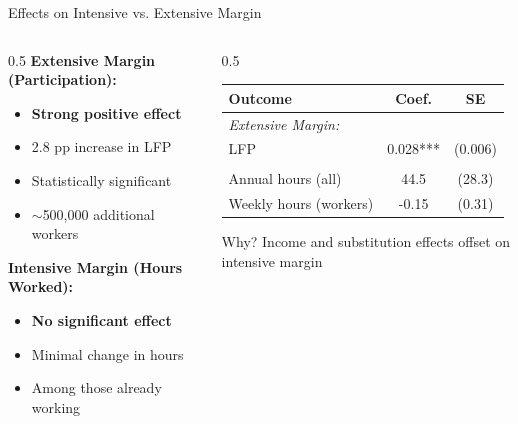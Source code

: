 \documentclass[aspectratio=169]{beamer}
\begin{document}
\begin{frame}{Effects on Intensive vs. Extensive Margin}
\begin{columns}
\begin{column}{0.5\textwidth}
\textbf{Extensive Margin (Participation):}
\begin{itemize}
    \item \textcolor{green!70!black}{\textbf{Strong positive effect}}
    \item 2.8 pp increase in LFP
    \item Statistically significant
    \item $\sim$500,000 additional workers
\end{itemize}

\vspace{0.5cm}
\textbf{Intensive Margin (Hours Worked):}
\begin{itemize}
    \item \textcolor{red!70!black}{\textbf{No significant effect}}
    \item Minimal change in hours
    \item Among those already working
\end{itemize}
\end{column}

\begin{column}{0.5\textwidth}
\begin{table}
\centering
\small
\begin{tabular}{lcc}
\toprule
\textbf{Outcome} & \textbf{Coef.} & \textbf{SE} \\
\midrule
\multicolumn{3}{l}{\textit{Extensive Margin:}} \\
LFP & 0.028*** & (0.006) \\
\addlinespace
\multicolumn{3}{l}{\textit{Intensive Margin:}} \\
Annual hours (all) & 44.5 & (28.3) \\
Weekly hours (workers) & -0.15 & (0.31) \\
\bottomrule
\end{tabular}
\end{table}

\vspace{0.3cm}
\begin{block}{Why?}
\small
Income and substitution effects offset on intensive margin
\end{block}
\end{column}
\end{columns}
\end{frame}
\end{document}
